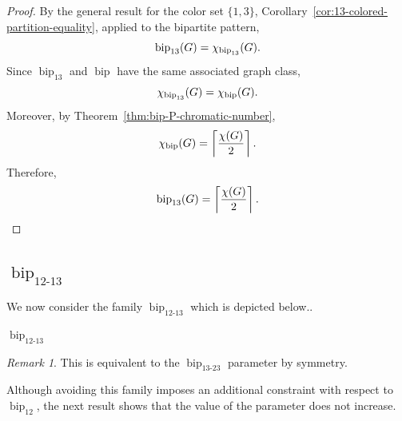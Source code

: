 \documentclass[12pt]{article}
\theoremstyle{plain}
\theoremstyle{definition}
\theoremstyle{remark}
\newtheorem{remark}[theorem]{Remark}
\theoremstyle{definition}
\newcommand{\biplabel}{\mathrm{bip}}
\DeclareRobustCommand{\bipname}{%
  \ensuremath{\mathop{\biplabel}\nolimits}%
}
\DeclareRobustCommand{\bipparam}[1]{%
  \ensuremath{\mathop{\biplabel}\nolimits_{#1}}%
}
\begin{document}
\begin{proof}
By the general result for the color set \(\{1,3\}\), Corollary~\ref{cor:13-colored-partition-equality}, applied to the bipartite pattern,
\[
\bipparam{13}(G)=\chi_{\bipparam{13}}(G).
\]
Since \(\bipparam{13}\) and \(\bipname\) have the same associated graph class,
\[
\chi_{\bipparam{13}}(G)
=
\chi_{\bipname}(G).
\]
Moreover, by Theorem~\ref{thm:bip-P-chromatic-number},
\[
\chi_{\bipname}(G)=\left\lceil\frac{\chi(G)}{2}\right\rceil.
\]
Therefore,
\[
\bipparam{13}(G)
=
\left\lceil\frac{\chi(G)}{2}\right\rceil.
\qedhere
\]
\end{proof}








\subsection{\texorpdfstring{\(\bipparam{12\text{-}13}\)}{bip12-13}}
\label{subsec:bip12-13}


We now consider the family \(\bipparam{12\text{-}13}\) which is depicted below.. 




\begin{center}

\smallskip
\(\bipparam{12\text{-}13}\)
\end{center}


\begin{remark}
  This is equivalent to the \(\bipparam{13\text{-}23}\) parameter by symmetry.
\end{remark}




Although avoiding
this family imposes an additional constraint with respect to
\(\bipparam{12}\), the next result shows that the value of the parameter
does not increase.
\end{document}
